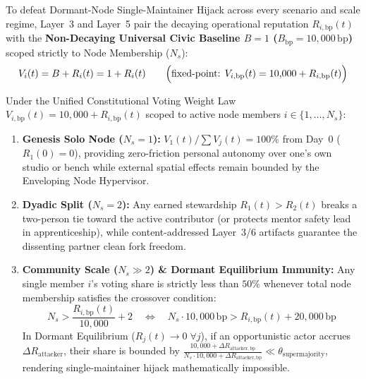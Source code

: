 To defeat Dormant-Node Single-Maintainer Hijack across every scenario and scale regime, Layer~3 and Layer~5 pair the decaying operational reputation $R_{i,\mathrm{bp}}(t)$ with the \textbf{Non-Decaying Universal Civic Baseline $B = 1$ ($B_{\mathrm{bp}} = 10{,}000\,\mathrm{bp}$)} scoped strictly to Node Membership ($N_s$):
\begin{equation}
V_i(t) = B + R_i(t) = 1 + R_i(t) \qquad \Bigl(\text{fixed-point: } V_{i,\mathrm{bp}}(t) = 10{,}000 + R_{i,\mathrm{bp}}(t)\Bigr)
\label{eq:ch5-unified-voting-formula}
\end{equation}

\begin{theorem}[Universal Anti-Capture Across $N_s = 1$, $N_s = 2$, and $N_s \gg 2$ (\texttt{CCI-2})]
\label{thm:ch5-anti-capture}
Under the Unified Constitutional Voting Weight Law $V_{i,\mathrm{bp}}(t) = 10{,}000 + R_{i,\mathrm{bp}}(t)$ scoped to active node members $i \in \{1, \dots, N_s\}$:
\begin{enumerate}
    \item \textbf{Genesis Solo Node ($N_s = 1$):} $V_1(t) / \sum V_j(t) = 100\%$ from Day~0 ($R_1(0) = 0$), providing zero-friction personal autonomy over one's own studio or bench while external spatial effects remain bounded by the Enveloping Node Hypervisor.
    \item \textbf{Dyadic Split ($N_s = 2$):} Any earned stewardship $R_1(t) > R_2(t)$ breaks a two-person tie toward the active contributor (or protects mentor safety lead in apprenticeship), while content-addressed Layer~3/6 artifacts guarantee the dissenting partner clean fork freedom.
    \item \textbf{Community Scale ($N_s \gg 2$) \& Dormant Equilibrium Immunity:} Any single member $i$'s voting share is strictly less than $50\%$ whenever total node membership satisfies the crossover condition:
    \begin{equation}
    N_s > \frac{R_{i,\mathrm{bp}}(t)}{10{,}000} + 2 \quad \Longleftrightarrow \quad N_s \cdot 10{,}000\,\mathrm{bp} > R_{i,\mathrm{bp}}(t) + 20{,}000\,\mathrm{bp}
    \label{eq:ch5-crossover}
    \end{equation}
    In Dormant Equilibrium ($R_j(t) \to 0 \;\forall j$), if an opportunistic actor accrues $\Delta R_{\mathrm{attacker}}$, their share is bounded by $\frac{10{,}000 + \Delta R_{\mathrm{attacker},\mathrm{bp}}}{N_s \cdot 10{,}000 + \Delta R_{\mathrm{attacker},\mathrm{bp}}} \ll \theta_{\mathrm{supermajority}}$, rendering single-maintainer hijack mathematically impossible.
\end{enumerate}
\end{theorem}

